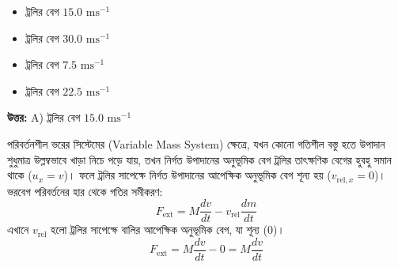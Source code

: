 \documentclass[12pt, a4paper]{article}
\begin{document}
{\begin{center}
\end{center}
\vspace{1em}

\begin{itemize}[label={}, leftmargin=1cm, itemsep=0.5em]
\item[\textbf{A)}] ট্রলির বেগ $15.0\text{ ms}^{-1}$
\item[\textbf{B)}] ট্রলির বেগ $30.0\text{ ms}^{-1}$
\item[\textbf{C)}] ট্রলির বেগ $7.5\text{ ms}^{-1}$
\item[\textbf{D)}] ট্রলির বেগ $22.5\text{ ms}^{-1}$
\end{itemize}

\vspace{0.5em}
\begin{tcolorbox}[answerbox]
\textbf{\color{success} উত্তর:} A) ট্রলির বেগ $15.0\text{ ms}^{-1}$
\end{tcolorbox}
\vspace{1em}

\begin{tcolorbox}[solutionbox={সমাধান (Solution)}]
\noindent
পরিবর্তনশীল ভরের সিস্টেমের (Variable Mass System) ক্ষেত্রে, যখন কোনো গতিশীল বস্তু হতে উপাদান শুধুমাত্র উল্লম্বভাবে খাড়া নিচে পড়ে যায়, তখন নির্গত উপাদানের অনুভূমিক বেগ ট্রলির তাৎক্ষণিক বেগের হুবহু সমান থাকে ($u_x = v$)। ফলে ট্রলির সাপেক্ষে নির্গত উপাদানের আপেক্ষিক অনুভূমিক বেগ শূন্য হয় ($v_{\text{rel},x} = 0$)। ভরবেগ পরিবর্তনের হার থেকে গতির সমীকরণ:
$$F_{\text{ext}} = M \frac{dv}{dt} - v_{\text{rel}} \frac{dm}{dt}$$
এখানে $v_{\text{rel}}$ হলো ট্রলির সাপেক্ষে বালির আপেক্ষিক অনুভূমিক বেগ, যা শূন্য ($0$)।
$$F_{\text{ext}} = M \frac{dv}{dt} - 0 = M \frac{dv}{dt}$$


\end{tcolorbox}}
\end{document}
